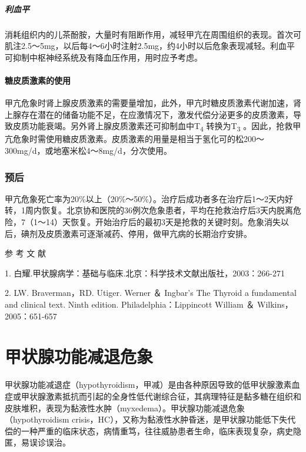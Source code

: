 \paragraph{利血平}

消耗组织内的儿茶酚胺，大量时有阻断作用，减轻甲亢在周围组织的表现。首次可肌注2.5～5mg，以后每4～6小时注射2.5mg，约4小时以后危象表现减轻。利血平可抑制中枢神经系统及有降血压作用，用时应予考虑。

\subsubsection{糖皮质激素的使用}

甲亢危象时肾上腺皮质激素的需要量增加，此外，甲亢时糖皮质激素代谢加速，肾上腺存在潜在的储备功能不足，在应激情况下，激发代偿分泌更多的皮质激素，导致皮质功能衰竭。另外肾上腺皮质激素还可抑制血中T\textsubscript{4}
转换为T\textsubscript{3}
。因此，抢救甲亢危象时需使用糖皮质激素。皮质激素的用量是相当于氢化可的松200～300mg/d，或地塞米松4～8mg/d，分次使用。

\subsection{预后}

甲亢危象死亡率为20\%以上（20\%～50\%）。治疗后成功者多在治疗后1～2天内好转，1周内恢复。北京协和医院的36例次危象患者，平均在抢救治疗后3天内脱离危险，7（1～14）天恢复。开始治疗后的最初3天是抢救的关键时刻。危象消失以后，碘剂及皮质激素可逐渐减药、停用，做甲亢病的长期治疗安排。
\protect\hypertarget{text00113.html}{}{}

\hypertarget{text00113.htmlux5cux23CHP4-9-5}{}
参 考 文 献

1. 白耀.甲状腺病学：基础与临床.北京：科学技术文献出版社，2003：266-271

2. LW. Braverman，RD. Utiger. Werner ＆ Ingbar's The Thyroid a
fundamental and clinical text. Ninth edition. Philadelphia：Lippincott
William ＆ Wilkins，2005：651-657

\protect\hypertarget{text00114.html}{}{}

\chapter{甲状腺功能减退危象}

甲状腺功能减退症（hypothyroidism，甲减）是由各种原因导致的低甲状腺激素血症或甲状腺激素抵抗而引起的全身性低代谢综合征，其病理特征是黏多糖在组织和皮肤堆积，表现为黏液性水肿（myxedema）。甲状腺功能减退危象（hypothyroidism
crisis，HC），又称为黏液性水肿昏迷，是甲状腺功能低下失代偿的一种严重的临床状态，病情重笃，往往威胁患者生命，临床表现复杂，病史隐匿，易误诊误治。

